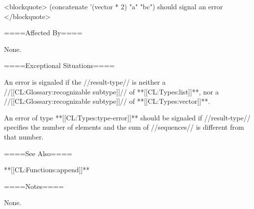 <blockquote> (concatenate '(vector * 2) "a" "bc") should signal an error </blockquote>

====Affected By====

None.

====Exceptional Situations====

An error is signaled if the //result-type// is neither a //[[CL:Glossary:recognizable subtype]]// of **[[CL:Types:list]]**, nor a //[[CL:Glossary:recognizable subtype]]// of **[[CL:Types:vector]]**.

An error of type **[[CL:Types:type-error]]** should be signaled if //result-type// specifies the number of elements and the sum of //sequences// is different from that number.

====See Also====

**[[CL:Functions:append]]**

====Notes====

None.



    
